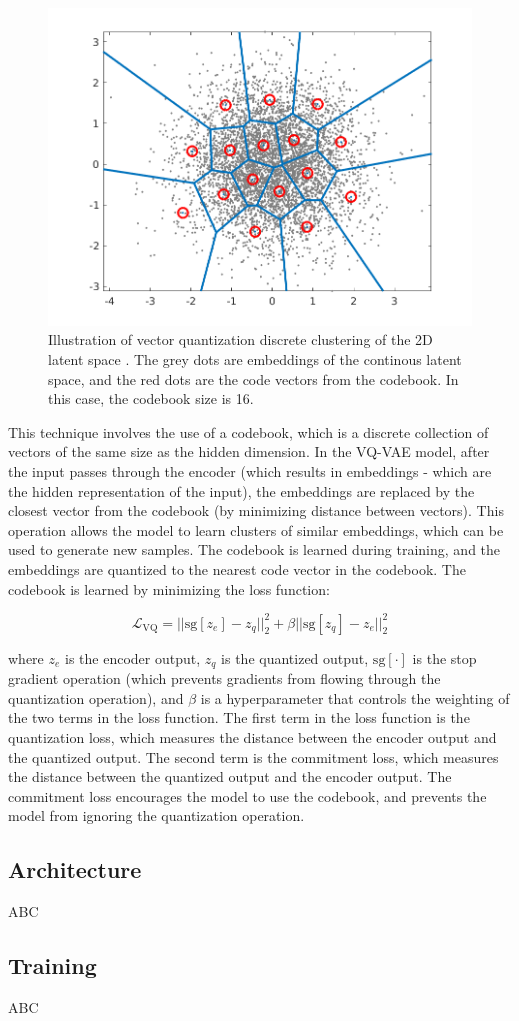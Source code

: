\begin{figure}[h]
    \centering
    \includegraphics[scale=0.5]{images/vq_visualization.png}
    \caption{Illustration of vector quantization discrete clustering of the 2D latent space \cite{vq_visualization_website}. The grey dots are embeddings of the continous latent space, and the red dots are the code vectors from the codebook. In this case, the codebook size is 16.}
    \label{figure:vq_visualization}
\end{figure}

This technique involves the use of a codebook, which is a discrete collection of vectors of the same size as the hidden dimension. In the VQ-VAE model, after the input passes through the encoder (which results in embeddings - which are the hidden representation of the input), the embeddings are replaced by the closest vector from the codebook (by minimizing distance between vectors). This operation allows the model to learn clusters of similar embeddings, which can be used to generate new samples. The codebook is learned during training, and the embeddings are quantized to the nearest code vector in the codebook. The codebook is learned by minimizing the loss function:

\begin{equation}
    \mathcal{L}_{\text{VQ}} = || \text{sg}[z_e] - z_q ||_2^2 + \beta || \text{sg}[z_q] - z_e ||_2^2
\label{eq:vq_loss}
\end{equation}

where $z_e$ is the encoder output, $z_q$ is the quantized output, $\text{sg}[\cdot]$ is the stop gradient operation (which prevents gradients from flowing through the quantization operation), and $\beta$ is a hyperparameter that controls the weighting of the two terms in the loss function. The first term in the loss function is the quantization loss, which measures the distance between the encoder output and the quantized output. The second term is the commitment loss, which measures the distance between the quantized output and the encoder output. The commitment loss encourages the model to use the codebook, and prevents the model from ignoring the quantization operation.

\subsection{Architecture}

ABC

\subsection{Training}

ABC
